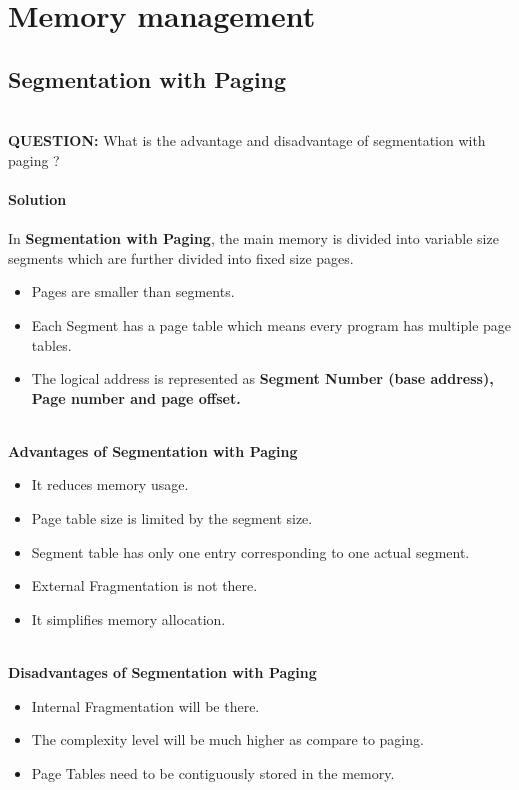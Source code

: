 \documentclass[a4paper]{article}
\begin{document}
\section{Memory management}
	\subsection{Segmentation with Paging}
	\hfill\\
	{\bfseries QUESTION:} What is the advantage and disadvantage of segmentation with paging ? \\
	\\
	{\bfseries Solution}\\
	\\
	In \textbf{Segmentation with Paging}, the main memory is divided into variable size segments which are further divided into fixed size pages.\\
    \begin{itemize}
        \item Pages are smaller than segments.
        \item Each Segment has a page table which means every program has multiple page tables.
        \item The logical address is represented as \textbf{Segment Number (base address), Page number and page offset.}
    \end{itemize}
    \hfill\\
    {\large {\bfseries Advantages of Segmentation with Paging}}
    \begin{itemize}
        \item It reduces memory usage.
        \item Page table size is limited by the segment size.
        \item Segment table has only one entry corresponding to one actual segment.
        \item External Fragmentation is not there.
        \item It simplifies memory allocation.
    \end{itemize}
    \hfill \\
    {\large {\bfseries Disadvantages of Segmentation with Paging}}
    \begin{itemize}
        \item Internal Fragmentation will be there.
        \item The complexity level will be much higher as compare to paging.
        \item Page Tables need to be contiguously stored in the memory.
    \end{itemize}
    \hfill\\
\end{document}
